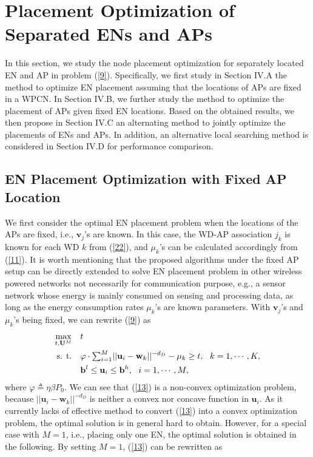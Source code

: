\documentclass[journal, draftcls, one column, 12pt]{IEEEtran}
\begin{document}
\section{Placement Optimization of Separated ENs and APs}
In this section, we study the node placement optimization for separately located EN and AP in problem (\ref{9}). Specifically, we first study in Section IV.A the method to optimize EN placement assuming that the locations of APs are fixed in a WPCN. In Section IV.B, we further study the method to optimize the placement of APs given fixed EN locations. Based on the obtained results, we then propose in Section IV.C an alternating method to jointly optimize the placements of ENs and APs. In addition, an alternative local searching method is considered in Section IV.D for performance comparison.

\subsection{EN Placement Optimization with Fixed AP Location}\label{sec:singEN}
We first consider the optimal EN placement problem when the locations of the APs are fixed, i.e., $\mathbf{v}_j$'s are known. In this case, the WD-AP association $j_k$ is known for each WD $k$ from (\ref{22}), and $\mu_k$'s can be calculated accordingly from (\ref{11}). It is worth mentioning that the proposed algorithms under the fixed AP setup can be directly extended to solve EN placement problem in other wireless powered networks not necessarily for communication purpose, e.g., a sensor network whose energy is mainly consumed on sensing and processing data, as long as the energy consumption rates $\mu_k$'s are known parameters. With $\mathbf{v}_j$'s and $\mu_k$'s being fixed, we can rewrite (\ref{9}) as
\begin{equation}
\label{13}
   \begin{aligned}
    \underset{t,\mathbf{U}^M}{\text{max}}&  & &  t\\
    \text{s. t.}&     & & \varphi\cdot \mathsmaller\sum_{i=1}^M ||\mathbf{u}_i -\mathbf{w}_k||^{-d_D} -\mu_k \geq t, \ \ k=1,\cdots,K,\\
    & & & \mathbf{b}^l\leq \mathbf{u}_i\leq \mathbf{b}^h,\ \ i=1,\cdots,M,
   \end{aligned}
\end{equation}
where $\varphi \triangleq  \eta \beta P_0$. We can see that (\ref{13}) is a non-convex optimization problem, because $||\mathbf{u}_i -\mathbf{w}_k||^{-d_D}$ is neither a convex nor concave function in $\mathbf{u}_i$. As it currently lacks of effective method to convert (\ref{13}) into a convex optimization problem, the optimal solution is in general hard to obtain. However, for a special case with $M=1$, i.e., placing only one EN, the optimal solution is obtained in the following. By setting $M=1$, (\ref{13}) can be rewritten as
\end{document}
